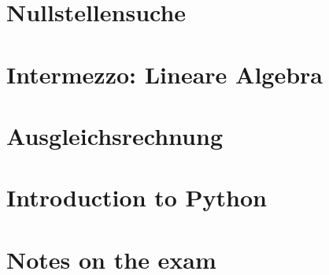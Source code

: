 \documentclass{article}
\begin{document}
\newsection
\section{Nullstellensuche}










\newsection
\section{Intermezzo: Lineare Algebra}





\newsection
\section{Ausgleichsrechnung}










\newsection
\section{Introduction to Python}
\label{sec:python}





\newsection
\section{Notes on the exam}

\end{document}
